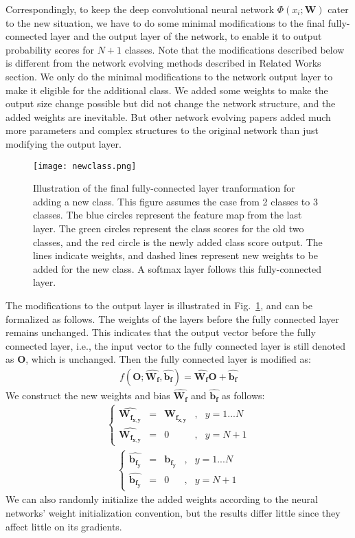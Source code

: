Correspondingly, to keep the deep convolutional neural network $\Phi(x_i; \mathbf{W})$ cater to the new situation, we have to do some minimal modifications to the final fully-connected layer and the output layer of the network, to enable it to output probability scores for $N+1$ classes. Note that the modifications described below is different from the network evolving methods described in Related Works section. We only do the minimal modifications to the network output layer to make it eligible for the additional class. We added some weights to make the output size change possible but did not change the network structure, and the added weights are inevitable. But other network evolving papers added much more parameters and complex structures to the original network than just modifying the output layer.
\begin{figure}[!htp]
	\centering
	\texttt{[image: newclass.png]}
	\caption[Illustration of the final linear layer tranformation for adding a new class]
	{Illustration of the final fully-connected layer tranformation for adding a new class. This figure assumes the case from 2 classes to 3 classes. The blue circles represent the feature map from the last layer. The green circles represent the class scores for the old two classes, and the red circle is the newly added class score output. The lines indicate weights, and dashed lines represent new weights to be added for the new class. A softmax layer follows this fully-connected layer.}
	\label{fig:newclass}
\end{figure}
The modifications to the output layer is illustrated in Fig.~\ref{fig:newclass}, and can be formalized as follows. The weights of the layers before the fully connected layer remains unchanged. This indicates that the output vector before the fully connected layer, i.e., the input vector to the fully connected layer is still denoted as $\mathbf{O}$, which is unchanged. Then the fully connected layer is modified as:
\begin{align}
f(\mathbf{O}; \hat{\mathbf{W_f}}, \hat{\mathbf{b_f}}) =  \hat{\mathbf{W_f}}\mathbf{O} + \hat{\mathbf{b_f}}
\end{align}
We construct the new weights and bias $\hat{\mathbf{W_f}}$ and $\hat{\mathbf{b_f}}$ as follows:
\begin{align}
\left\{
	\begin{aligned}
	\hat{\mathbf{W_{f_{x,y}}}} & = & \mathbf{W_{f_{x,y}}}& ,& y = 1...N\\
	\hat{\mathbf{W_{f_{x,y}}}} & = & 0&,& y = N+1	
	\end{aligned}
\right.
\end{align}
\begin{align}
\left\{
\begin{aligned}
\hat{\mathbf{b_{f_{y}}}} & = & \mathbf{b_{f_{y}}}& ,& y = 1...N\\
\hat{\mathbf{b_{f_{y}}}} & = & 0&,& y = N+1	
\end{aligned}
\right.
\end{align}
We can also randomly initialize the added weights according to the neural networks' weight initialization convention, but the results differ little since they affect little on its gradients.

